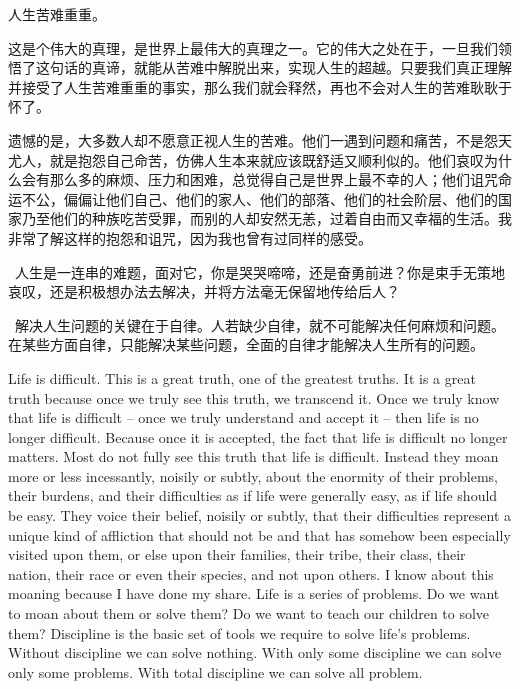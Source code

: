\documentclass[UTF-8]{ctexart}
\begin{document}
人生苦难重重。

这是个伟大的真理，是世界上最伟大的真理之一。它的伟大之处在于，一旦我们领悟了这句话的真谛，就能从苦难中解脱出来，实现人生的超越。只要我们真正理解并接受了人生苦难重重的事实，那么我们就会释然，再也不会对人生的苦难耿耿于怀了。

遗憾的是，大多数人却不愿意正视人生的苦难。他们一遇到问题和痛苦，不是怨天尤人，就是抱怨自己命苦，仿佛人生本来就应该既舒适又顺利似的。他们哀叹为什么会有那么多的麻烦、压力和困难，总觉得自己是世界上最不幸的人；他们诅咒命运不公，偏偏让他们自己、他们的家人、他们的部落、他们的社会阶层、他们的国家乃至他们的种族吃苦受罪，而别的人却安然无恙，过着自由而又幸福的生活。我非常了解这样的抱怨和诅咒，因为我也曾有过同样的感受。

 人生是一连串的难题，面对它，你是哭哭啼啼，还是奋勇前进？你是束手无策地哀叹，还是积极想办法去解决，并将方法毫无保留地传给后人？

 解决人生问题的关键在于自律。人若缺少自律，就不可能解决任何麻烦和问题。在某些方面自律，只能解决某些问题，全面的自律才能解决人生所有的问题。

Life is difficult.
This is a great truth, one of the greatest truths. It is a great truth because once we truly see this truth, we transcend it. Once we truly know that life is difficult -- once we truly understand and accept it -- then life is no longer difficult. Because once it is accepted, the fact that life is difficult no longer matters.
Most do not fully see this truth that life is difficult. Instead they moan more or less incessantly, noisily or subtly, about the enormity of their problems, their burdens, and their difficulties as if life were generally easy, as if life should be easy. They voice their belief, noisily or subtly, that their difficulties represent a unique kind of affliction that should not be and that has somehow been especially visited upon them, or else upon their families, their tribe, their class, their nation, their race or even their species, and not upon others. I know about this moaning because I have done my share.
Life is a series of problems. Do we want to moan about them or solve them? Do we want to teach our children to solve them?
Discipline is the basic set of tools we require to solve life's problems. Without discipline we can solve nothing. With only some discipline we can solve only some problems. With total discipline we can solve all problem.
\end{document}
